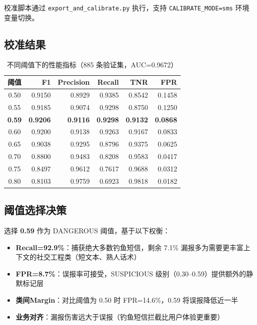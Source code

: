\documentclass[11pt,a4paper]{article}
\begin{document}
校准脚本通过 \texttt{export\_and\_calibrate.py} 执行，支持 \texttt{CALIBRATE\_MODE=sms} 环境变量切换。

\subsection{校准结果}

\begin{table}[H]
\centering
\caption{不同阈值下的性能指标（885 条验证集，AUC=0.9672）}
\begin{tabular}{crrrrr}
\toprule
阈值 & F1 & Precision & Recall & TNR & FPR \\
\midrule
0.50 & 0.9150 & 0.8929 & 0.9385 & 0.8542 & 0.1458 \\
0.55 & 0.9185 & 0.9074 & 0.9298 & 0.8750 & 0.1250 \\
\textbf{0.59} & \textbf{0.9206} & \textbf{0.9116} & \textbf{0.9298} & \textbf{0.9132} & \textbf{0.0868} \\
0.60 & 0.9200 & 0.9138 & 0.9263 & 0.9167 & 0.0833 \\
0.65 & 0.9038 & 0.9295 & 0.8796 & 0.9375 & 0.0625 \\
0.70 & 0.8800 & 0.9483 & 0.8208 & 0.9583 & 0.0417 \\
0.75 & 0.8497 & 0.9612 & 0.7617 & 0.9688 & 0.0312 \\
0.80 & 0.8103 & 0.9759 & 0.6923 & 0.9818 & 0.0182 \\
\bottomrule
\end{tabular}
\end{table}

\subsection{阈值选择决策}

选择 \textbf{0.59} 作为 DANGEROUS 阈值，基于以下权衡：

\begin{itemize}
  \item \textbf{Recall=92.9\%}：捕获绝大多数钓鱼短信，剩余 7.1\% 漏报多为需要更丰富上下文的社交工程类（短文本、熟人话术）
  \item \textbf{FPR=8.7\%}：误报率可接受，SUSPICIOUS 级别（0.30--0.59）提供额外的静默标记层
  \item \textbf{类间Margin}：对比阈值为 0.50 时 FPR=14.6\%，0.59 将误报降低近一半
  \item \textbf{业务对齐}：漏报伤害远大于误报（钓鱼短信拦截比用户体验更重要）
\end{itemize}
\end{document}
